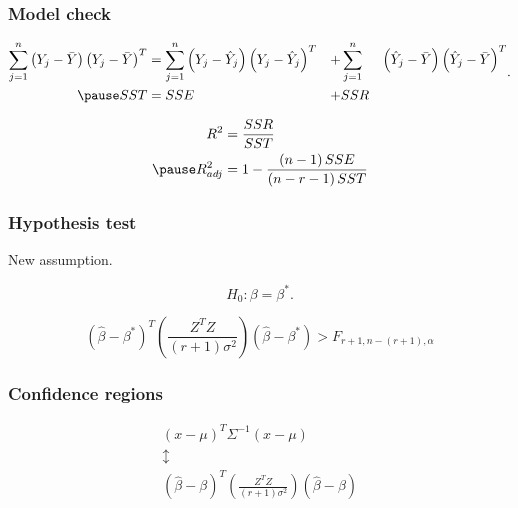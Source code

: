 \documentclass[aspectratio=169,10pt,t]{beamer}
\begin{document}
\begin{frame}[t]
	\frametitle{Model check}
	
	\[
		\begin{aligned}
			\sum^{n}_{j=1} 
			\left( Y_j -\bar{Y}   \right)
			\left( Y_j -\bar{Y}    \right) ^{T}
			&=
			\sum^{n}_{j=1} 
			\left( Y_j -\hat{Y}_{j}  \right)
			\left( Y_j -\hat{Y}_{j}  \right)^{T}
			&+
			&\sum^{n}_{j=1}& 
			\left( \hat{Y}_{j} - \bar{Y}  \right) 
			\left( \hat{Y}_{j} - \bar{Y}  \right) ^{T} \\
			\pause
			SST &= SSE &+ &SSR
		\end{aligned}
	.\] 

	\[
	 \begin{aligned}
		 R^{2} &= \frac{SSR}{SST} \\
		 \pause
		 R^{2}_{adj} & = 1 - \frac{ \left( n-1 \right) SSE}{ \left( n-r-1 \right) SST} 
	 \end{aligned}
	\] 
\end{frame}

\begin{frame}[t]
	\frametitle{Hypothesis test}

	New assumption.

	\[
	H_0 : \beta = \beta^{*}
	.\] 

	\[
		\left( \hat{\beta} - \beta^{*}\right) ^{T}
		\left( \frac{Z^{T}Z}{ \left( r+1 \right) \sigma^{2}}   \right) 
		\left( \hat{\beta}  -\beta^{*}\right) 
		>
		F_{r+1,n- \left( r+1 \right) , \alpha}
	\] 

	
\end{frame}

\begin{frame}[t]
	\frametitle{Confidence regions}

	\[
	\begin{gathered}
		\left( x- \mu  \right) ^{T} \Sigma^{-1}  \left( x- \mu \right) \\
													 \updownarrow\\
													 \left( \hat{\beta} - \beta \right) ^{T}
													 \left( \frac{Z^{T}Z}{ \left( r+1 \right) \sigma^{2}}   \right) 
													 \left( \hat{\beta}  -\beta\right) 
	\end{gathered}
	\] 

\end{frame}
\end{document}
